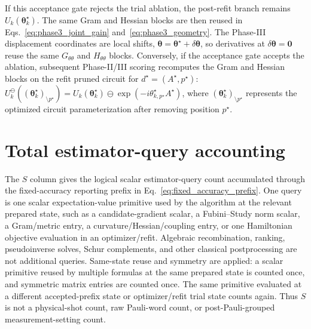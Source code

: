 \documentclass[
  reprint,
  amsmath,
  amssymb,
  aps,
  pra,
  nofootinbib,
  superscriptaddress,
  floatfix
]{revtex4-2}
\begin{document}
If this acceptance gate rejects the trial ablation, the post-refit
branch remains \(U_k(\boldsymbol\theta_k^\star)\). The same Gram and Hessian
blocks are then reused in Eqs.~\eqref{eq:phase3_joint_gain}
and~\eqref{eq:phase3_geometry}.
The Phase-III displacement coordinates are local
shifts, \(\boldsymbol\theta=\boldsymbol\theta^\star+
\delta\boldsymbol\theta\), so derivatives at
\(\delta\boldsymbol\theta=\mathbf 0\) reuse the same
\(G_{\theta\theta}\) and \(H_{\theta\theta}\) blocks. Conversely, if the acceptance gate accepts the ablation, subsequent Phase-II/III
scoring recomputes the Gram and Hessian blocks on the refit pruned circuit
for \(d^\star=(A^\star,p^\star)\):
\(U_k^{\ominus}((\boldsymbol\theta_k^\star)_{\setminus p^\star})
=
U_k(\boldsymbol\theta_k^\star)\ominus
\exp(-i\theta_{k,p^\star}^\star A^\star)\), where \((\boldsymbol\theta_k^\star)_{\setminus p^\star}\) represents the optimized circuit parameterization after removing position \(p^\star\).




\section{Total estimator-query accounting}
\label{app:estimator_queries}
The \(S\) column gives the logical scalar estimator-query count accumulated
through the fixed-accuracy reporting prefix in
Eq.~\eqref{eq:fixed_accuracy_prefix}. One query is one scalar expectation-value
primitive used by the algorithm at the relevant prepared state, such as a
candidate-gradient scalar, a Fubini--Study norm scalar, a Gram/metric entry, a
curvature/Hessian/coupling entry, or one Hamiltonian objective evaluation in an
optimizer/refit. Algebraic recombination, ranking, pseudoinverse solves, Schur
complements, and other classical postprocessing are not additional queries.
Same-state reuse and symmetry are applied: a scalar primitive reused by
multiple formulas at the same prepared state is counted once, and symmetric
matrix entries are counted once. The same primitive evaluated at a different
accepted-prefix state or optimizer/refit trial state counts again. Thus \(S\)
is not a physical-shot count, raw Pauli-word count, or post-Pauli-grouped
measurement-setting count.
\end{document}
